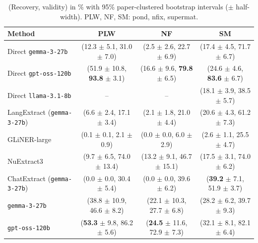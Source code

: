 \begin{table}[t]
\centering
\caption{(Recovery, validity) in \% with 95\% paper-clustered bootstrap intervals ($\pm$ half-width). PLW, NF, SM: pond, nfix, supermat.}
\label{tab:recovery-validity}
\begin{tabular}{lccc}
\toprule
Method & PLW & NF & SM \\
\midrule
Direct \texttt{gemma-3-27b} & (12.3 $\pm$ 5.1, 31.0 $\pm$ 7.0) & (2.5 $\pm$ 2.6, 22.7 $\pm$ 6.9) & (17.4 $\pm$ 4.5, 71.7 $\pm$ 6.7) \\
Direct \texttt{gpt-oss-120b} & (51.9 $\pm$ 10.8, \textbf{93.8} $\pm$ 3.1) & (16.6 $\pm$ 9.6, \textbf{79.8} $\pm$ 6.5) & (24.6 $\pm$ 4.6, \textbf{83.6} $\pm$ 6.7) \\
Direct \texttt{llama-3.1-8b} & -- & -- & (18.1 $\pm$ 3.9, 38.5 $\pm$ 5.7) \\
LangExtract (\texttt{gemma-3-27b}) & (6.6 $\pm$ 2.4, 17.1 $\pm$ 3.4) & (2.1 $\pm$ 1.8, 21.0 $\pm$ 4.4) & (20.6 $\pm$ 4.3, 61.2 $\pm$ 7.3) \\
GLiNER-large & (0.1 $\pm$ 0.1, 2.1 $\pm$ 0.9) & (0.0 $\pm$ 0.0, 6.0 $\pm$ 2.9) & (2.6 $\pm$ 1.1, 25.5 $\pm$ 4.7) \\
NuExtract3 & (9.7 $\pm$ 6.5, 74.0 $\pm$ 13.4) & (13.2 $\pm$ 9.1, 46.7 $\pm$ 15.1) & (17.5 $\pm$ 3.1, 74.0 $\pm$ 6.2) \\
ChatExtract (\texttt{gemma-3-27b}) & (0.0 $\pm$ 0.0, 30.4 $\pm$ 5.4) & (0.0 $\pm$ 0.0, 39.6 $\pm$ 6.2) & (\textbf{39.2} $\pm$ 7.1, 51.9 $\pm$ 3.7) \\
\midrule
\texttt{gemma-3-27b} & (38.8 $\pm$ 10.9, 46.6 $\pm$ 8.2) & (22.1 $\pm$ 10.3, 27.7 $\pm$ 6.8) & (28.2 $\pm$ 6.2, 39.7 $\pm$ 9.3) \\
\texttt{gpt-oss-120b} & (\textbf{53.3} $\pm$ 9.8, 86.2 $\pm$ 5.6) & (\textbf{24.5} $\pm$ 11.6, 72.9 $\pm$ 7.3) & (32.1 $\pm$ 8.1, 82.1 $\pm$ 6.4) \\
\bottomrule
\end{tabular}
\end{table}
